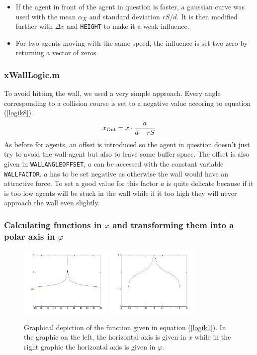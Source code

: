 \begin{itemize}
	\item If the agent in front of the agent in question is faster, a gaussian curve was used with the mean $\alpha_X$ and standard deviation $rS/d$. It is then modified further with $\Delta v$ and \texttt{HEIGHT} to make it a weak influence.
	\item For two agents moving with the same speed, the influence is set two zero by returning a vector of zeros.
\end{itemize}


\subsubsection{xWallLogic.m}
To avoid hitting the wall, we used a very simple approach. Every angle corresponding to a collision course is set to a negative value accoring to equation (\ref{logik8}).
\begin{equation}\label{logik8}
	x_{\text{Out}} = x \cdot \frac{a}{d - rS}
\end{equation}
\noi As before for agents, an offset is introduced so the agent in question doesn't just try to avoid the wall-agent but also to leave some buffer space. The offset is also given in \texttt{WALLANGLEOFFSET}, $a$ can be accessed with the constant variable \texttt{WALLFACTOR}. $a$ has to be set negative as otherwise the wall would have an attractive force. To set a good value for this factor $a$ is quite delicate because if it is too low agents will be stuck in the wall while if it too high they will never approach the wall even slightly. 

\subsubsection{Calculating functions in $x$ and transforming them into a polar axis in $\varphi$}
\begin{figure}[h!]
	\centering
		\includegraphics[width=0.40\textwidth]{pictures/Bsp2}
		\includegraphics[width=0.40\textwidth]{pictures/Bsp2Angle}
	\caption{Graphical depiction of the function given in equation (\ref{logik1}). In the graphic on the left, the horizontal axis is given in $x$ while in the right graphic the horizontal axis is given in $\varphi$.}
	\label{fig:Bsp2}
\end{figure}

